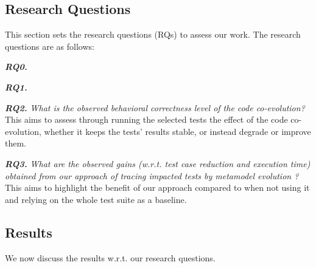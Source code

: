 \subsection{Research Questions}
This section sets the research questions (RQs) to assess our work. The research questions are as follows:


\textbf{\emph{RQ0.}}  

\textbf{\emph{RQ1.}}   %
    
\textbf{\emph{RQ2.}} \emph{What is the observed behavioral correctness level of the code co-evolution?} This aims to assess through running the selected tests the effect of the code co-evolution, whether it keeps the tests' results stable, or instead degrade or improve them. %


\textbf{\emph{RQ3.}} \emph{What are the observed gains (w.r.t. test case reduction and execution time) obtained from our approach of tracing impacted tests by metamodel evolution ?} This aims to highlight the benefit of our approach compared to when not using it and relying on the whole test suite as a baseline. %



\subsection{Results}
We now discuss the results w.r.t. our research questions.


